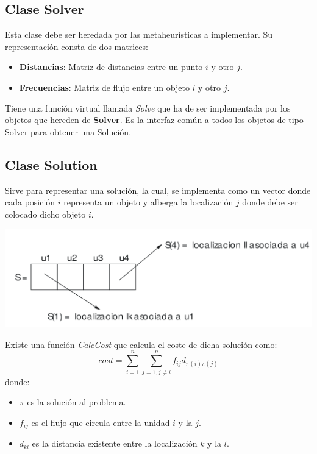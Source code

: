 \documentclass[a4paper, 12pt]{article}
\begin{document}
   \subsection*{Clase Solver}
   Esta clase debe ser heredada por las metaheurísticas a implementar. Su representación consta de dos matrices:
   \begin{itemize}
      \item \textbf{Distancias}: Matriz de distancias entre un punto $i$ y otro $j$.
      \item \textbf{Frecuencias}: Matriz de flujo entre un objeto $i$ y otro $j$. 
   \end{itemize}
   Tiene una función virtual llamada \textit{Solve} que ha de ser implementada por los objetos que hereden de \textbf{Solver}. Es la interfaz común a todos los objetos de tipo Solver para obtener una Solución.
   
   \newpage
   \subsection*{Clase Solution}
   Sirve para representar una solución, la cual, se implementa como un vector donde cada posición $i$ representa un objeto y alberga la localización $j$ donde debe ser colocado dicho objeto $i$. 
   
   \begin{center}
      \includegraphics[scale=0.14]{solRep}
   \end{center}
   
   Existe una función \textit{CalcCost} que calcula el coste de dicha solución como:
      $$cost = \sum_{i=1}^{n}\sum_{j=1, j \neq i}^{n} f_{ij}d_{\pi(i)\pi(j)}$$
   donde:
   \begin{itemize}
      \item $\pi$ es la solución al problema.
      
      \item $f_{ij}$ es el flujo que circula entre la unidad $i$ y la $j$.
      
      \item $d_{kl}$ es la distancia existente entre la localización $k$ y la $l$.
   \end{itemize}\vspace*{0.5cm}
   
\end{document}
